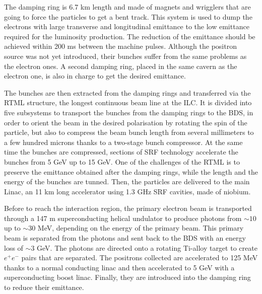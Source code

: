     The damping ring is 6.7 km length and made of magnets and wrigglers that are going to force the particles to get a bent track.
    This system is used to dump the electrons with large transverse and longitudinal emittance to the low emittance required for the luminosity production.
    The reduction of the emittance should be achieved within 200 ms between the machine pulses.
    Although the positron source was not yet introduced, their bunches suffer from the same problems as the electron ones. 
    A second damping ring, placed in the same cavern as the electron one, is also in charge to get the desired emittance.

    The bunches are then extracted from the damping rings and transferred via the \gls{RTML} structure, the longest continuous beam line at the \gls{ILC}.
    It is divided into five subsystems to transport the bunches from the damping rings to the \gls{BDS}, in order to orient the beam in the desired polarisation by rotating the spin of the particle, but also to compress the beam bunch length from several millimeters to a few hundred microns thanks to a two-stage bunch compressor.
    At the same time the bunches are compressed, sections of \gls{SRF} technology accelerate the bunches from 5 GeV up to 15 GeV.
    One of the challenges of the \gls{RTML} is to preserve the emittance obtained after the damping rings, while the length and the energy of the bunches are tunned.
    Then, the particles are delivered to the main Linac, an 11 km long accelerator using 1.3 GHz \gls{SRF} cavities, made of niobium.

    Before to reach the interaction region, the primary electron beam is transported through a 147 m superconducting helical undulator to produce photons from $\sim 10$ up to $\sim 30$ MeV, depending on the energy of the primary beam.
    This primary beam is separated from the photons and sent back to the \gls{BDS} with an energy loss of $\sim 3$ GeV.
    The photons are directed onto a rotating Ti-alloy target to create $e^+e^-$ pairs that are separated.
    The positrons collected are accelerated to 125 MeV thanks to a normal conducting linac and then accelerated to 5 GeV with a superconducting boost linac.
    Finally, they are introduced into the damping ring to reduce their emittance.


